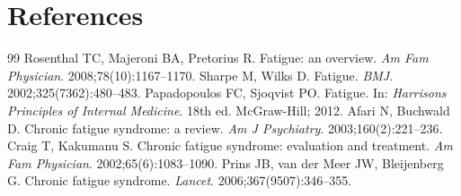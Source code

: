 \section*{References}
\begin{thebibliography}{99}
Rosenthal TC, Majeroni BA, Pretorius R. Fatigue: an overview. \textit{Am Fam Physician}. 2008;78(10):1167--1170.
Sharpe M, Wilks D. Fatigue. \textit{BMJ}. 2002;325(7362):480--483.
Papadopoulos FC, Sjoqvist PO. Fatigue. In: \textit{Harrisons Principles of Internal Medicine}. 18th ed. McGraw-Hill; 2012.
Afari N, Buchwald D. Chronic fatigue syndrome: a review. \textit{Am J Psychiatry}. 2003;160(2):221--236.
Craig T, Kakumanu S. Chronic fatigue syndrome: evaluation and treatment. \textit{Am Fam Physician}. 2002;65(6):1083--1090.
Prins JB, van der Meer JW, Bleijenberg G. Chronic fatigue syndrome. \textit{Lancet}. 2006;367(9507):346--355.
\end{thebibliography}
